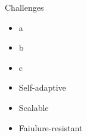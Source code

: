\begin{frame}{Challenges}
  \begin{card}
    \begin{itemize}
      \item a
      \item b
      \item c
    \end{itemize}
  \end{card}
  \begin{card}
    \begin{itemize}
      \item[\faThumbsUp] Self-adaptive
      \item[\faThumbsUp] Scalable
      \item[\faThumbsUp] Faiulure-resistant 
    \end{itemize}
  \end{card}
\end{frame}